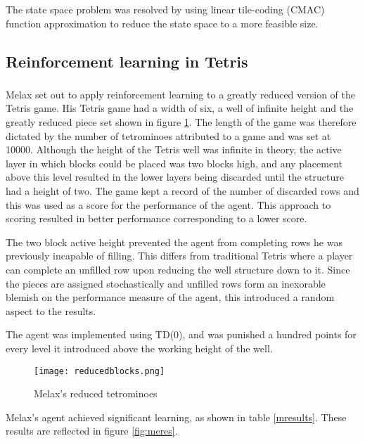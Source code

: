 \documentclass{rucsthesis}
\begin{document}
The state space problem was resolved by using linear tile-coding (CMAC) function approximation to reduce the state space to a more feasible size\citep{keepaway}.

\subsection{Reinforcement learning in Tetris}

\subsubsection{\cite{melaxtetris}}

Melax set out to apply reinforcement learning to a greatly reduced version of the Tetris game. His Tetris game had a width of six, a well of infinite height and the greatly reduced piece set shown in figure \ref{fig:melaxpieces}. The length of the game was therefore dictated by the number of tetrominoes attributed to a game and was set at 10000. Although the height of the Tetris well was infinite in theory, the active layer in which blocks could be placed was two blocks high, and any placement above this level resulted in the lower layers being discarded until the structure had a height of two. The game kept a record of the number of discarded rows and this was used as a score for the performance of the agent. This approach to scoring resulted in better performance corresponding to a lower score. 

The two block active height prevented the agent from completing rows he was previously incapable of filling. This differs from traditional Tetris where a player can complete an unfilled row upon reducing the well structure down to it. Since the pieces are assigned stochastically and unfilled rows form an inexorable blemish on the performance measure of the agent, this introduced a random aspect to the results.

The agent was implemented using TD(0), and was punished a hundred points for every level it introduced above the working height of the well.

\begin{figure}[h]
\centering
\texttt{[image: reducedblocks.png]}
\caption{Melax's reduced tetrominoes}
\label{fig:melaxpieces}
\end{figure}

Melax's agent achieved significant learning, as shown in table \ref{mresults}. These results are reflected in figure \ref{fig:meres}.
\end{document}
